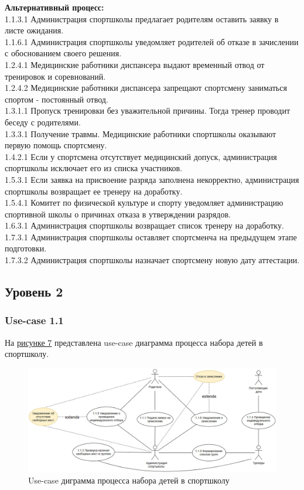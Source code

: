 \documentclass[12pt,a4paper,final]{article} %
\begin{document}
\par \textbf{Альтернативный процесс:} \\
1.1.3.1 Администрация спортшколы предлагает родителям оставить заявку в листе ожидания. \\
1.1.6.1 Администрация спортшколы уведомляет родителей об отказе в зачислении с обоснованием своего решения. \\
1.2.4.1 Медицинские работники диспансера выдают временный отвод от тренировок и соревнований. \\
1.2.4.2 Медицинские работники диспансера запрещают спортсмену заниматься спортом - постоянный отвод. \\
1.3.1.1 Пропуск тренировки без уважительной причины. Тогда тренер проводит беседу с родителями. \\
1.3.3.1 Получение травмы. Медицинские работники спортшколы оказывают первую помощь спортсмену.\\
1.4.2.1 Если у спортсмена отсутствует медицинский допуск, администрация спортшколы исключает его из списка участников.\\
1.5.3.1 Если заявка на присвоение разряда заполнена некорректно, администрация спортшколы возвращает ее тренеру на доработку. \\
1.5.4.1 Комитет по физической культуре и спорту уведомляет администрацию спортивной школы о причинах отказа в утверждении разрядов. \\
1.6.3.1 Администрация спортшколы возвращает список тренеру на доработку. \\
1.7.3.1 Администрация спортшколы оставляет спортсменча на предыдущем этапе подготовки. \\
1.7.3.2 Администрация спортшколы назначает спортсмену новую дату аттестации.

 
\setcounter{figure}{6}

\subsection{Уровень 2}
\subsubsection{Use-case 1.1}
\par На \hyperref[fig:im7]{рисунке 7} представлена use-case диаграмма процесса набора детей в спортшколу.
\begin{figure}[h!]
	\hspace{- 1.55cm} 
	\centering
	\includegraphics[width=1.1\linewidth]{images/4}
	\caption{Use-case диграмма процесса набора детей в спортшколу}
	\label{fig:im7}
\end{figure}	
\end{document}
